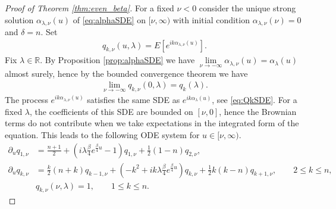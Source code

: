 \documentclass[10pt,a4paper]{amsart}
\newcommand{\R}{{\mathbb R}}
\begin{document}
\begin{proof}[Proof of Theorem \ref{thm:even_beta}]
For a fixed $\nu<0$ consider the unique strong solution $\alpha_{\lambda,\nu}(u)$ of \eqref{eq:alphaSDE} on $[\nu,\infty)$ with initial condition $\alpha_{\lambda,\nu}(\nu)=0$ and $\delta=n$. Set 
\begin{align}
    q_{k,\nu}(u,\lambda)=E[e^{i k \alpha_{\lambda,\nu}(u)}].
\end{align}
Fix $\lambda\in \R$. By Proposition \ref{prop:alphaSDE} we have  $\lim\limits_{\nu\to -\infty} \alpha_{\lambda,\nu}(u)=\alpha_\lambda(u)$ almost surely, hence by the bounded convergence theorem we have 
\begin{align}
    \lim_{\nu\to -\infty}  q_{k,\nu}(0,\lambda)=q_k(\lambda). 
\end{align}
The process $e^{i k \alpha_{\lambda,\nu}(u)}$ satisfies the same SDE as $e^{i k \alpha_\lambda(u)}$, see \eqref{eq:QkSDE}. For a fixed $\lambda$, the coefficients of this SDE are bounded on $[\nu,0]$, hence the Brownian terms do not contribute when we take expectations in the integrated form of the equation. 
This leads to the following ODE system for $u\in [\nu,\infty)$.
\begin{align}\label{eq:ODEq1}
    \partial_u q_{1,\nu}&=\frac{n+1}{2}+(i \lambda \tfrac{\beta}{4}e^{\frac{\beta}{4}u}-1) q_{1,\nu}+\frac{1}{2}(1-n)q_{2,\nu},\\\label{eq:ODEq2}
    \partial_u q_{k,\nu}&=\frac{k}{2} (n +k) q_{k-1,\nu}+(-k^2 + i k \lambda \tfrac{\beta}{4}e^{\frac{\beta}{4}u})q_{k,\nu}+\frac{1}{2} k (k-n )q_{k+1,\nu}, \qquad 2\le k\le n,\\[3pt]
   &q_{k,\nu}(\nu,\lambda)=1, \qquad 1\le k\le n. 
\end{align}

\end{proof}
\end{document}
